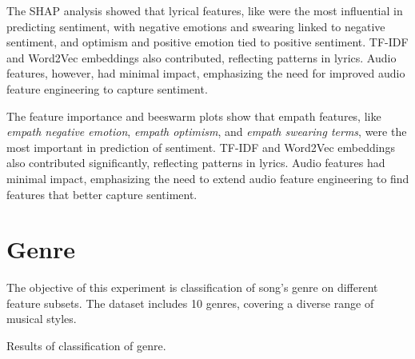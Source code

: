 The SHAP analysis showed that lyrical features, like were
the most influential in predicting sentiment, with negative emotions and
swearing linked to negative sentiment, and optimism and positive emotion tied
to positive sentiment. TF-IDF and Word2Vec embeddings also contributed,
reflecting patterns in lyrics. Audio features, however, had minimal impact,
emphasizing the need for improved audio feature engineering to capture
sentiment.

The feature importance and beeswarm plots show that empath features, like
\textit{empath negative emotion}, \textit{empath optimism}, and \textit{empath
swearing terms}, were the most important in prediction of sentiment. TF-IDF and
Word2Vec embeddings also contributed significantly, reflecting patterns in
lyrics. Audio features had minimal impact, emphasizing the need to extend audio
feature engineering to find features that better capture sentiment.

\section{Genre}
\label{sec:genre}

The objective of this experiment is classification of song's genre on different
feature subsets. The dataset includes 10 genres, covering a diverse range of
musical styles.

\begin{table}[H]
\centering
\caption{Results of classification of genre.}
\end{table}

